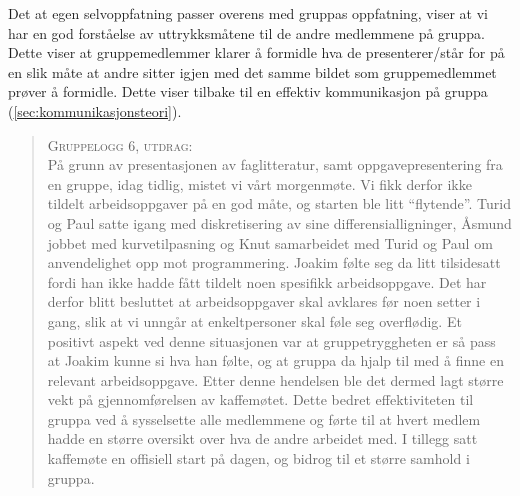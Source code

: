 Det at egen selvoppfatning passer overens med gruppas oppfatning, viser at vi har en god
forståelse av uttrykksmåtene til de andre medlemmene på gruppa. Dette viser at gruppemedlemmer
klarer å formidle hva de presenterer/står for på en slik måte at andre sitter
igjen med det samme bildet som gruppemedlemmet prøver å formidle. Dette viser
tilbake til en effektiv kommunikasjon på gruppa
(\ref{sec:kommunikasjonsteori}).\\


\begin{quote}
\hspace{20pt} \textsc{Gruppelogg 6, utdrag:}\\
  
På grunn av presentasjonen av faglitteratur, samt oppgavepresentering fra en gruppe,
idag tidlig, mistet vi vårt morgenmøte. Vi fikk derfor ikke tildelt arbeidsoppgaver på 
en god måte, og starten ble litt ``flytende''. Turid og Paul satte igang med diskretisering
av sine differensialligninger, Åsmund jobbet med kurvetilpasning og Knut samarbeidet
med Turid og Paul om anvendelighet opp mot programmering. Joakim følte seg da litt
tilsidesatt fordi han ikke hadde fått tildelt noen spesifikk arbeidsoppgave. Det har derfor
blitt besluttet at arbeidsoppgaver skal avklares før noen setter i gang, slik at vi unngår at                                           
enkeltpersoner skal føle seg overflødig. Et positivt aspekt ved denne situasjonen var at
gruppetryggheten er så pass at Joakim kunne si hva han følte, og at gruppa da hjalp til
med å finne en relevant arbeidsoppgave. Etter denne hendelsen ble det dermed lagt større vekt 
på gjennomførelsen av kaffemøtet. Dette bedret effektiviteten til gruppa ved å sysselsette 
alle medlemmene og førte til at hvert medlem hadde en større oversikt over hva de andre arbeidet
med. I tillegg satt kaffemøte en offisiell start på dagen, og bidrog til et større samhold i gruppa.
\end{quote}

